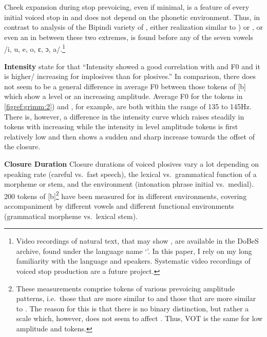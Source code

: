 \documentclass[output=paper]{LSP/langsci}
\begin{document}
Cheek expansion during stop prevoicing, even if minimal, is a feature of every initial voiced stop in  and does not depend on the phonetic environment. Thus, in contrast to  analysis of the Bipindi variety of , either realization similar to ) or , or even an  in between these two extremes, is found before any of the seven vowels /i, u, e, o, ɛ, ɔ, a/.\footnote{Video recordings of natural  text, that may show , are available in the DoBeS archive, found under the language name `'. In this paper, I rely on my long familiarity with the language and speakers. Systematic video recordings of voiced stop production are a future project.} 

{\bf Intensity} \citet[75]{Nagano2012} state for  that ``Intensity showed a good correlation with  and F0 and it is higher/ increasing for implosives than for plosives.'' In comparison, there does not seem to be a general difference in average F0 between those tokens of [b] which show a level or an increasing amplitude. Average F0 for the tokens in \ref{figref:grimm:2}) and ,  for example, are both within the range of 135 to 145Hz. There is, however, a difference in the intensity curve which raises steadily in tokens with increasing  while the intensity in level amplitude tokens is first relatively low and then shows a sudden and sharp increase towards the offset of the closure.



{\bf Closure Duration} Closure durations of voiced plosives vary a lot depending on speaking rate (careful vs.\ fast speech), the lexical vs.\ grammatical function of a morpheme or stem, and the environment (intonation phrase initial vs.\ medial).
200 tokens of [b]\footnote{These measurements comprise tokens of various prevoicing amplitude patterns, i.e.\ those that are more similar to  and those that are more similar to . The reason for this is that there is no binary distinction, but rather a scale which, however, does not seem to affect . Thus, VOT is the same for low amplitude and  tokens.} have been measured for  in different environments, covering accompaniment by different vowels and different functional environments (grammatical morpheme vs.\ lexical stem). 
\end{document}
